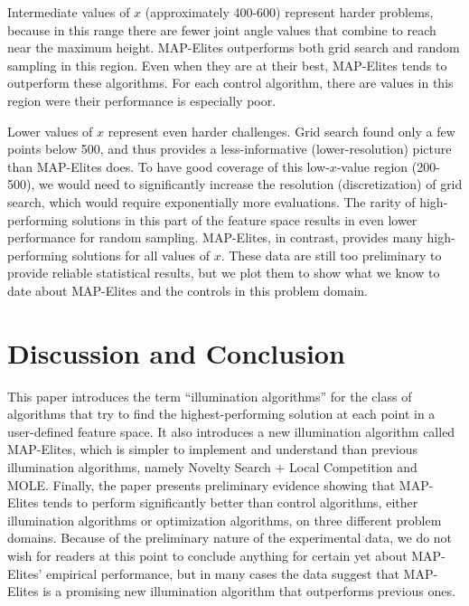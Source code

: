 \documentclass[twocolumn, DIV25, 9pt]{scrartcl}
\begin{document}
Intermediate values of $x$ (approximately 400-600) represent harder problems, because in this range there are fewer joint angle values that combine to reach near the maximum height. MAP-Elites outperforms both grid search and random sampling in this region. Even when they are at their best, MAP-Elites tends to outperform these algorithms. For each control algorithm, there are values in this region were their performance is especially poor. 

Lower values of $x$ represent even harder challenges. Grid search found only a few points below 500, and thus provides a less-informative (lower-resolution) picture than MAP-Elites does. 
%
To have good coverage of this low-$x$-value region (200-500), we would need to significantly increase the resolution (discretization) of grid search, which would require exponentially more evaluations. The rarity of high-performing solutions in this part of the feature space results in even lower performance for random sampling. MAP-Elites, in contrast, provides many high-performing solutions for all values of $x$. These data are still too preliminary to provide reliable statistical results, but we plot them to show what we know to date about MAP-Elites and the controls in this problem domain. 

\section{Discussion and Conclusion}

This paper introduces the term ``illumination algorithms'' for the class of algorithms that try to find the highest-performing solution at each point in a user-defined feature space. It also introduces a new illumination algorithm called MAP-Elites, which is simpler to implement and understand than previous illumination algorithms, namely Novelty Search + Local Competition\cite{lehman2011evolving} and MOLE\cite{clune2013originModularity}.  Finally, the paper presents preliminary evidence showing that MAP-Elites tends to perform significantly better than control algorithms, either illumination algorithms or optimization algorithms, on three different problem domains. Because of the preliminary nature of the experimental data, we do not wish for readers at this point to conclude anything for certain yet about MAP-Elites' empirical performance, but in many cases the data  suggest that MAP-Elites is a promising new illumination algorithm that outperforms previous ones. 
\end{document}
